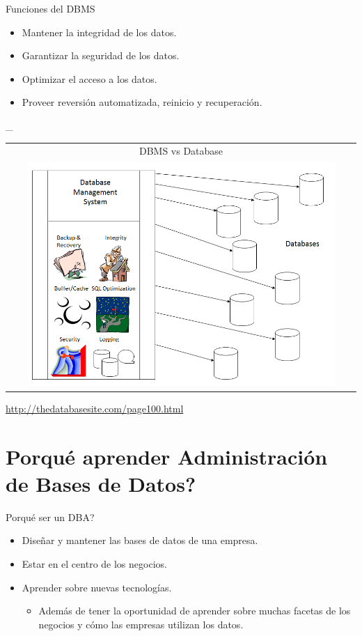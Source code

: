 \documentclass{beamer}
\newcommand{\toRight}[1]{
    \begin{FlushRight}
        {\tiny #1}
    \end{FlushRight}
}
\begin{document}
\begin{frame}{Funciones del DBMS}
    \begin{itemize}
        \item Mantener la integridad de los datos.
        \item Garantizar la seguridad de los datos.
        \item Optimizar el acceso a los datos.
        \item Proveer reversión automatizada, reinicio y recuperación.
    \end{itemize}
\end{frame}

\begin{frame}{\_}
    \begin{tabular}{c}
        DBMS vs Database \\
        \includegraphics[width=0.9\textwidth]{figures/dbms_vs_database.png}
    \end{tabular}
    \toRight{\url{http://thedatabasesite.com/page100.html}}
\end{frame}

\section{Porqué aprender Administración de Bases de Datos?}

\begin{frame}{Porqué ser un DBA?}
    \begin{itemize}
        \item Diseñar y mantener las bases de datos de una empresa.
        \item Estar en el centro de los negocios.
        \item Aprender sobre nuevas tecnologías.
        \begin{itemize}
            \item Además de tener la oportunidad de aprender sobre muchas facetas de los negocios y cómo las empresas utilizan los datos.
        \end{itemize}
    \end{itemize}
\end{frame}
\end{document}
